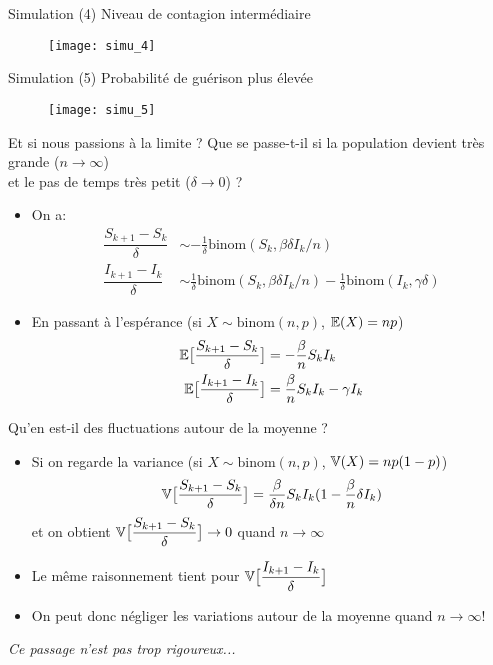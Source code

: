 \documentclass[10pt]{beamer}
\begin{document}
\begin{frame}{Simulation (4)}
  Niveau de contagion intermédiaire
  \begin{figure}
    \texttt{[image: simu\_4]}
  \end{figure}
\end{frame}

\begin{frame}{Simulation (5)}
  Probabilité de guérison plus élevée
  \begin{figure}
    \texttt{[image: simu\_5]}
  \end{figure}
\end{frame}

\begin{frame}{Et si nous passions à la limite ?}
  Que se passe-t-il si la population devient très grande ($n \to \infty$) \\
  et le pas de temps très petit ($\delta \to 0$) ?
  \begin{itemize}
    \item On a:
    \[
      \begin{aligned}
        \dfrac{S_{k+1} - S_k}{\delta} &\sim - \frac{1}{\delta} \text{binom}(S_k, \beta \delta I_k / n)
      \\
        \dfrac{I_{k+1} - I_k}{\delta} &\sim \frac{1}{\delta} \text{binom}(S_k, \beta \delta I_k / n) -
        \frac{1}{\delta} \text{binom}(I_k, \gamma \delta)
      \end{aligned}
    \]
  \item En passant à l'espérance (si $X \sim \text{binom}(n, p)$, $\mathbb{E}(X) = n p$)
    \[
      \begin{aligned}
        \mathbb{E}\big[\dfrac{S_{k+1} - S_k}{\delta}\big] &= -\frac{\beta}{n} S_k I_k
      \\
        \mathbb{E}\big[\dfrac{I_{k+1} - I_k}{\delta}\big] &= \frac{\beta}{n} S_k I_k - \gamma I_k
      \end{aligned}
    \]
  \end{itemize}
\end{frame}

\begin{frame}{Qu'en est-il des fluctuations autour de la moyenne ?}
  \begin{itemize}
    \item Si on regarde la variance (si $X \sim \text{binom}(n, p)$, $\mathbb{V}(X) = n p (1- p)$)
    \[
        \mathbb{V}\big[\dfrac{S_{k+1} - S_k}{\delta}\big] = \frac{\beta}{\delta n} S_k I_k (1 - \frac{\beta}{n} \delta I_k)
    \]
    et on obtient $\mathbb{V}\big[\dfrac{S_{k+1} - S_k}{\delta}\big] \to 0$ quand $n \to \infty$
  \item Le même raisonnement tient pour $\mathbb{V}\big[\dfrac{I_{k+1} - I_k}{\delta}\big]$
  \item On peut donc négliger les variations autour de la moyenne quand $n \to \infty$!
  \end{itemize}

  \emph{Ce passage n'est pas trop rigoureux...}
\end{frame}
\end{document}
